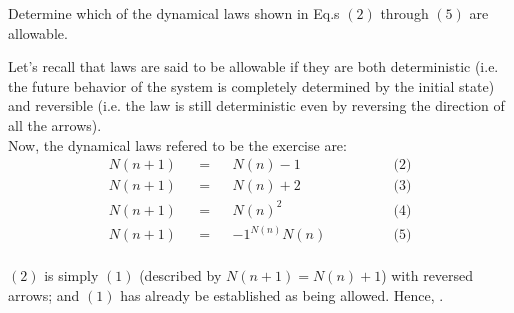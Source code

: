 \documentclass[solutions.tex]{subfiles}
\begin{document}
\maketitle
\begin{exercise}
Determine which of the dynamical laws shown in Eq.s $(2)$ through
$(5)$ are allowable.
\end{exercise}
Let's recall that laws are said to be allowable if they are both
deterministic (i.e. the future behavior of the system is completely
determined by the initial state) and reversible (i.e. the law is
still deterministic even by reversing the direction of all the arrows). \\

Now, the dynamical laws refered to be the exercise are:
\begin{equation*} \begin{aligned}
	N(n+1) &&=&& N(n)-1 &\qquad\qquad \text{(2)} \\
	N(n+1) &&=&& N(n)+2 &\qquad\qquad \text{(3)} \\
	N(n+1) &&=&& N(n)^2 &\qquad\qquad \text{(4)} \\
	N(n+1) &&=&& -1^{N(n)}N(n) &\qquad\qquad \text{(5)} \\
\end{aligned} \end{equation*}

\hr

\begin{figure}[H]
	\centering
\end{figure}

$(2)$ is simply $(1)$ (described by $N(n+1)= N(n)+1$) with reversed
arrows; and $(1)$ has already be established as being allowed. Hence,
.

\hr
\end{document}
